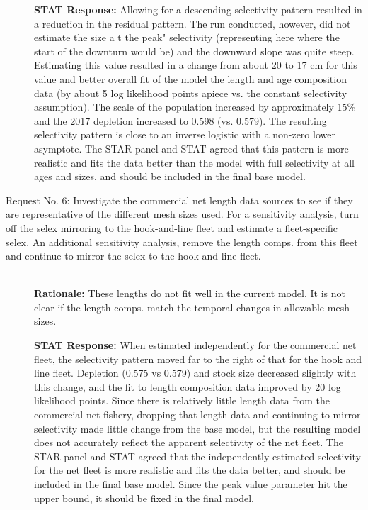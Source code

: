 \documentclass[12pt,]{article}
\begin{document}
\begin{description}
\textbf{STAT Response:} Allowing for a descending selectivity pattern resulted in a 
reduction in the residual pattern. The run conducted, however, did not estimate the 
size a t the peak" selectivity (representing here where the start of the downturn 
would be) and the downward slope was quite steep. Estimating this value resulted in 
a change from about 20 to 17 cm for this value and better overall fit of the model 
the length and age composition data (by about 5 log likelihood points apiece vs. 
the constant selectivity assumption).  The scale of the population increased by 
approximately 15\% and the 2017 depletion increased to 0.598 (vs. 0.579). The 
resulting selectivity pattern is close to an inverse logistic with a non-zero 
lower asymptote.  The STAR panel and STAT agreed that this pattern is more 
realistic and fits the data better than the model with full selectivity at 
all ages and sizes, and should be included in the final base model.   
    
    
\item[Request No. 6: Investigate the commercial net length data sources to see if 
they are representative of the different mesh sizes used.  For a sensitivity analysis, 
turn off the selex mirroring to the hook-and-line fleet and estimate a fleet-specific selex.  
An additional sensitivity analysis, remove the length comps. from this fleet and 
continue to mirror the selex to the hook-and-line fleet.] \hfill \\

\textbf{Rationale:} These lengths do not fit well in the current model.  It is 
not clear if the length comps. match the temporal changes in allowable mesh sizes. 
  
  
\textbf{STAT Response:} When estimated independently for the commercial net fleet, 
the selectivity pattern moved far to the right of that for the hook and line fleet. 
Depletion (0.575 vs 0.579) and stock size decreased slightly with this change, and 
the fit to length composition data improved by 20 log likelihood points. Since 
there is relatively little length data from the commercial net fishery, dropping 
that length data and continuing to mirror selectivity made little change from the 
base model, but the resulting model does not accurately reflect the apparent 
selectivity of the net fleet. The STAR panel and STAT agreed that the independently 
estimated selectivity for the net fleet is more realistic and fits the data better, 
and should be included in the final base model. Since the peak value parameter 
hit the upper bound, it should be fixed in the final model.
    

\end{description}
\end{document}
